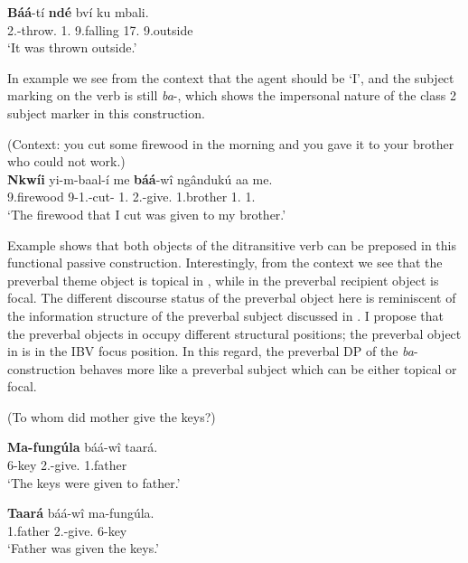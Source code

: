 \documentclass[output=paper,colorlinks,citecolor=brown,
]{langscibook}
\begin{document}
\begin{exe}
\ex
\label{127}
\gll
\textbf{Báá}-tí \textbf{ndé} bví ku mbali.\\
2\Sm{}.\Pst{}-throw.\Pst{} 1.\Pro{} 9.falling 17.\Loc{} 9.outside\\
\trans ‘It was thrown outside.’ 

\end{exe}
In example  we see from the context that the agent should be `I', and the subject marking on the verb is still \textit{ba}-, which shows the impersonal nature of the class 2 subject marker in this construction.
\begin{exe}
\ex
\label{128}
 (Context: you cut some firewood in the morning and you gave it to your brother who could not work.) \\
\gll
\textbf{Nkwíi} yi-m-baal-í me \textbf{báá}-wî ngândukú aa me.\\
9.firewood 9\Rel{}-1\Sg{}.\Sm{}-cut-\Pst{} 1\Sg{}.\Pro{} 2\Sm{}.\Pst{}-give.\Pst{} 1.brother 1.\Conn{} 1\Sg{}.\Pro{}\\
\trans ‘The firewood that I cut was given to my brother.’

\end{exe}
Example  shows that both objects of the ditransitive verb can be preposed in this functional passive construction. Interestingly, from the context we see that the preverbal theme object is topical in , while in  the preverbal recipient object is focal. The different discourse status of the preverbal object here is reminiscent of the information structure of the preverbal subject discussed in . I propose that the preverbal objects in  occupy different structural positions; the preverbal object in  is in the IBV focus position. In this regard, the preverbal DP of the \textit{ba}- construction behaves more like a preverbal subject which can be either topical or focal.
\begin{exe}
    \ex (To whom did mother give the keys?)\label{129}
    \begin{xlist}
\ex
\label{129a}
\gll
\textbf{Ma-fungúla} báá-wî taará.\\
6-key 2\Sm{}.\Pst{}-give.\Pst{} 1.father\\
\trans ‘The keys were given to father.’

\ex
\label{129b}
\gll
\textbf{Taará} báá-wî ma-fungúla.\\
1.father 2\Sm{}.\Pst{}-give.\Pst{} 6-key\\
\trans ‘Father was given the keys.’

    \end{xlist}
\end{exe}
\end{document}
